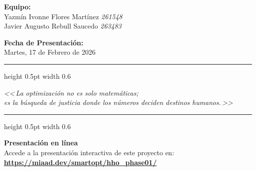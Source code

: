\documentclass[12pt,letterpaper]{article}
\begin{document}
\begin{titlepage}
\begin{center}
    \vfill %

    {\normalsize\textbf{Equipo:}}\\[6pt]
    {\normalsize Yazmín Ivonne Flores Martínez \textcolor{uacjgray}{\textbullet} \textit{261548}}\\[3pt]
    {\normalsize Javier Augusto Rebull Saucedo \textcolor{uacjgray}{\textbullet} \textit{263483}}

    \vspace{0.8cm}

    {\normalsize\textbf{Fecha de Presentación:}}\\[4pt]
    {\normalsize Martes, 17 de Febrero de 2026}

    \vspace{1.0cm} %

\end{center}
\end{titlepage}

\newpage
\thispagestyle{empty} %
\vspace*{\fill} %

\begin{center}
    {\color{uacjgray}\hrule height 0.5pt width 0.6\textwidth} 
    \vspace{0.8cm}
    
    {\Large\itshape\color{uacjgray} 
    <<\,La optimización no es solo matemáticas;\\
    es la búsqueda de justicia donde los números deciden destinos humanos.\,>>}
    
    \vspace{0.8cm}
    {\color{uacjgray}\hrule height 0.5pt width 0.6\textwidth}
    
    \vspace{1.5cm}
    
    \begin{tcolorbox}[
        colback=headerblue!6,
        colframe=headerblue,
        boxrule=1.5pt,
        arc=6pt,
        width=0.75\textwidth,
        halign=center,
        top=6mm,
        bottom=6mm
    ]
        {\large\bfseries\color{headerblue} \quad Presentación en línea \quad{}}\\[8pt]
        {\normalsize Accede a la presentación interactiva de este proyecto en:}\\[6pt]
        {\large\bfseries\url{https://miaad.dev/smartopt/hho_phase01/}}
    \end{tcolorbox}
\end{center}
\end{document}
